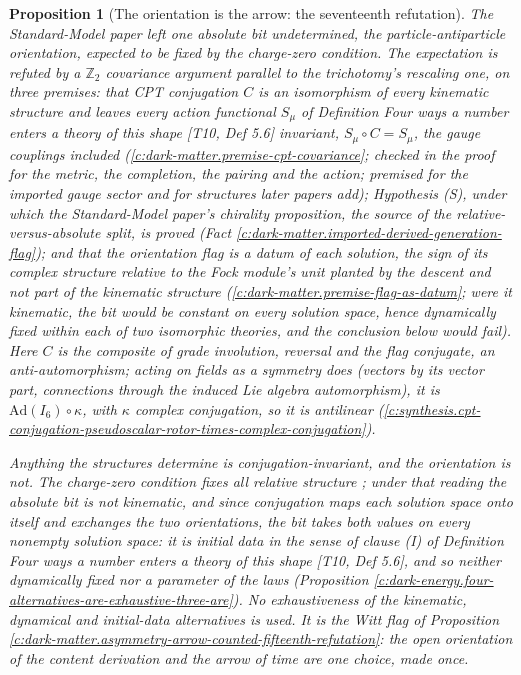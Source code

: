 \documentclass[11pt]{article}
\newtheorem{proposition}[theorem]{Proposition}
\theoremstyle{definition}
\theoremstyle{plain}
\newcommand{\changedmark}[2]{\marginpar{\raggedright\scriptsize\color{#1}#2}}
\begin{document}
\begin{proposition}[The orientation is the arrow: the seventeenth refutation]\label{c:dark-matter.orientation-arrow-seventeenth-refutation}
\changedmark{BurntOrange}{changed since the deposit}
The Standard-Model paper left one absolute bit undetermined, the particle-antiparticle orientation, expected to be fixed by the charge-zero condition. The expectation is refuted by a $\mathbb{Z}_{2}$ covariance argument parallel to the trichotomy's rescaling one, on three premises: that CPT conjugation $C$ is an isomorphism of every kinematic structure and leaves every action functional $S_{\mu}$ of Definition \emph{Four ways a number enters a theory of this shape} [T10, Def 5.6] invariant, $S_{\mu}\circ C = S_{\mu}$, the gauge couplings included (\ref{c:dark-matter.premise-cpt-covariance}; checked in the proof for the metric, the completion, the pairing and the action; premised for the imported gauge sector and for structures later papers add); Hypothesis (S), under which the Standard-Model paper's chirality proposition, the source of the relative-versus-absolute split, is proved (Fact \ref{c:dark-matter.imported-derived-generation-flag}); and that the orientation flag is a datum of each solution, the sign of its complex structure relative to the Fock module's unit planted by the descent and not part of the kinematic structure (\ref{c:dark-matter.premise-flag-as-datum}; were it kinematic, the bit would be constant on every solution space, hence dynamically fixed within each of two isomorphic theories, and the conclusion below would fail). Here $C$ is the composite of grade involution, reversal and the flag conjugate, an anti-automorphism; acting on fields as a symmetry does (vectors by its vector part, connections through the induced Lie algebra automorphism), it is $\mathrm{Ad}(I_{6}) \circ \kappa$, with $\kappa$ complex conjugation, so it is antilinear (\ref{c:synthesis.cpt-conjugation-pseudoscalar-rotor-times-complex-conjugation}).

Anything the structures determine is conjugation-invariant, and the orientation is not. The charge-zero condition fixes all \emph{relative} structure \cite[Prop.~5.6]{ButlerT12}; under that reading the absolute bit is not kinematic, and since conjugation maps each solution space onto itself and exchanges the two orientations, the bit takes both values on every nonempty solution space: it is initial data in the sense of clause (I) of Definition \emph{Four ways a number enters a theory of this shape} [T10, Def 5.6], and so neither dynamically fixed nor a parameter of the laws (Proposition \ref{c:dark-energy.four-alternatives-are-exhaustive-three-are}). No exhaustiveness of the kinematic, dynamical and initial-data alternatives is used. It is the Witt flag of Proposition \ref{c:dark-matter.asymmetry-arrow-counted-fifteenth-refutation}: the open orientation of the content derivation and the arrow of time are one choice, made once.


\end{proposition}
\end{document}
